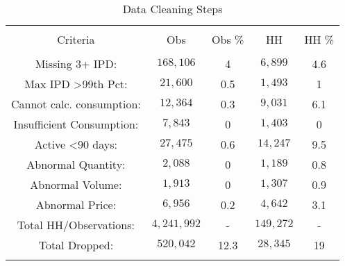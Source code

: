 
\begin{table}[!htbp] \centering 
  \caption{Data Cleaning Steps} 
  \label{tab:tpPurchClean} 
\begin{tabular}{@{\extracolsep{5pt}} ccccc} 
\\[-1.8ex]\hline 
\hline \\[-1.8ex] 
Criteria & Obs & Obs \% & HH & HH \% \\ 
\hline \\[-1.8ex] 
Missing 3+ IPD: & $168,106$ & 4 & $6,899$ & 4.6 \\ 
Max IPD \textgreater  99th Pct: & $21,600$ & 0.5 & $1,493$ & 1 \\ 
Cannot calc. consumption: & $12,364$ & 0.3 & $9,031$ & 6.1 \\ 
Insufficient Consumption: & $7,843$ & 0 & $1,403$ & 0 \\ 
Active \textless  90 days: & $27,475$ & 0.6 & $14,247$ & 9.5 \\ 
Abnormal Quantity: & $2,088$ & 0 & $1,189$ & 0.8 \\ 
Abnormal Volume: & $1,913$ & 0 & $1,307$ & 0.9 \\ 
Abnormal Price: & $6,956$ & 0.2 & $4,642$ & 3.1 \\ 
Total HH/Observations: & $4,241,992$ & - & $149,272$ & - \\ 
Total Dropped: & $520,042$ & 12.3 & $28,345$ & 19 \\ 
\hline \\[-1.8ex] 
\end{tabular} 
\end{table} 
